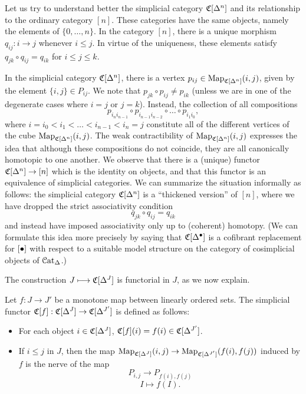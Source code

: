\begin{remark}\label{conervexp}
Let us try to understand better the simplicial category $\operatorname{\mathfrak{C}}[\Delta^n]$ and its relationship to the ordinary category $[n]$. These categories have the same objects, namely the elements of $\{ 0, \ldots, n\}$.
In the category $[n]$, there is a unique morphism $q_{ij}: i \rightarrow j$ whenever $i \leq j$. In virtue of the uniqueness, these elements satisfy $q_{jk} \circ q_{ij} = q_{ik}$ for $i \leq j \leq k$.

In the simplicial category $\operatorname{\mathfrak{C}}[\Delta^n]$, there is a vertex
$p_{ij} \in \operatorname{{Map}}_{ \operatorname{\mathfrak{C}}[\Delta^n] }(i,j)$, given by the element
$\{ i, j \} \in P_{ij}$. We note that $p_{jk} \circ p_{ij} \neq p_{ik}$ (unless we are in one of the degenerate cases where
$i =j$ or $j=k$). Instead, the collection of all compositions
$$ p_{i_n i_{n-1}} \circ p_{i_{n-1} i_{n-2}} \circ \ldots \circ p_{i_1 i_0},$$ where 
$i=i_0 < i_1 < \ldots <  i_{n-1} < i_n = j$ constitute all of the different vertices of the cube 
$\operatorname{{Map}}_{\operatorname{\mathfrak{C}}[\Delta^n]}(i,j)$. The weak contractibility of $\operatorname{{Map}}_{\operatorname{\mathfrak{C}}[\Delta^n]}(i,j)$
expresses the idea that although these compositions do not coincide, they are all canonically homotopic to one another. We observe that there is a (unique) functor
$\operatorname{\mathfrak{C}}[\Delta^n] \rightarrow [n]$ which is the identity on objects, and that this functor
is an equivalence of simplicial categories. We can summarize the situation informally as follows: the simplicial category $\operatorname{\mathfrak{C}}[\Delta^n]$ is a ``thickened version'' of $[n]$, where
we have dropped the strict associativity condition
$$ q_{jk} \circ q_{ij} = q_{ik}$$ and instead have imposed associativity only up to (coherent) homotopy. (We can formulate this idea more precisely by saying that $\operatorname{\mathfrak{C}}[ \Delta^{\bullet}]$ is a cofibrant replacement for $[\bullet]$ with respect to a suitable model structure on the category of cosimplicial objects of $\operatorname{\mathcal{C}at_{\Delta}}$.)
\end{remark}

The construction $J \longmapsto \operatorname{\mathfrak{C}}[\Delta^J]$ is functorial in $J$, as we now explain.

\begin{definition}\label{csimp2}
Let $f: J \rightarrow J'$ be a monotone map between linearly
ordered sets. The simplicial functor $\operatorname{\mathfrak{C}}[f]:
\operatorname{\mathfrak{C}}[\Delta^J] \rightarrow \operatorname{\mathfrak{C}}[\Delta^{J'}]$ is defined
as follows:

\begin{itemize}
\item For each object $i \in \operatorname{\mathfrak{C}}[\Delta^J]$,
$\operatorname{\mathfrak{C}}[f](i) = f(i) \in \operatorname{\mathfrak{C}}[\Delta^{J'}]$.

\item If $i \leq j$ in $J$, then the map
$ \operatorname{{Map}}_{\operatorname{\mathfrak{C}}[\Delta^J]}(i,j) \rightarrow
\operatorname{{Map}}_{\operatorname{\mathfrak{C}}[\Delta^{J'}]}(f(i),f(j))$ induced by $f$ is the nerve of the map $$P_{i,j}
\rightarrow P_{f(i),f(j)}$$
$$ I \mapsto f(I).$$
\end{itemize}
\end{definition}

